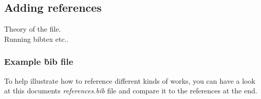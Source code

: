 \subsection{Adding references}

Theory of the file. \\
Running bibtex etc..

\subsubsection{Example \.bib file}

\citet{ea05} To help illustrate how to reference different kinds of works, you can have a
look at this documents \emph{references.bib} file and compare it to the
references at the end.

